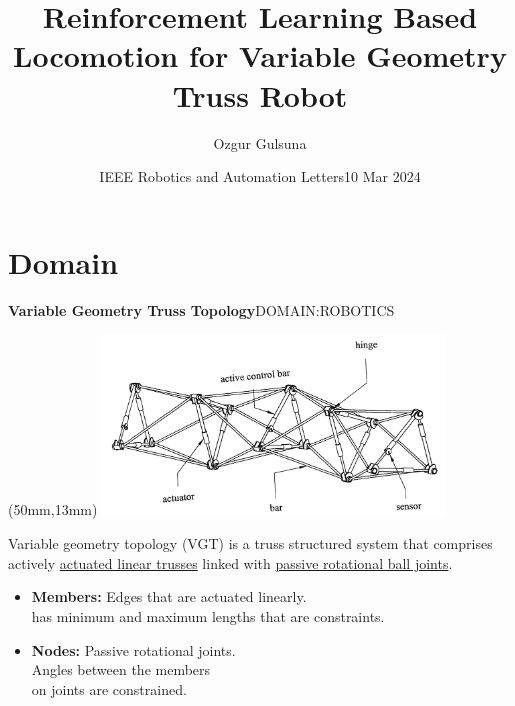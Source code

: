 \documentclass[11pt,aspectratio=169]{beamer}
\title{Reinforcement Learning Based Locomotion for Variable Geometry Truss Robot }
\date[ABC 2021]{IEEE Robotics and Automation Letters}
\author{\fontsize{10}{13}\selectfont Ozgur Gulsuna}
\institute{\textbf{MMI706} \\ Reinforcement Learning}
\begin{document}

\def\mydate{10 Mar 2024}
\date{\mydate}


\titleframe

\tocframe

\section{Domain}

\begin{frame}[fragile]{\textbf{Variable Geometry Truss Topology}\hfill \fontsize{8}{8}\selectfont DOMAIN:ROBOTICS}
    
        \begin{textblock*}{5cm}(50mm,13mm) %
        \includegraphics[height=48mm]{elements/[1]-VTT.png}
        \end{textblock*}

        Variable geometry topology (VGT) is a truss structured system that comprises actively \uline{actuated linear trusses} linked with \uline{passive rotational ball joints}.

        \medskip
        
        \begin{itemize}
            \item \textbf{Members:} Edges that are actuated linearly. \\
            has minimum and maximum lengths that are constraints.
            \item \textbf{Nodes:} Passive rotational joints. \\
            Angles between the members \\
            on joints are constrained.
        \end{itemize}

        \bigskip
        \bigskip
        \medskip
        

\end{frame}
\end{document}
